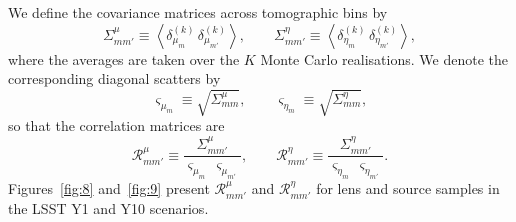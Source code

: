 We define the covariance matrices across tomographic bins by
\begin{equation} \label{eq:31}
    \Sigma^\mu_{m m'} \equiv \left\langle \delta^{(k)}_{\mu_{m}} \, \delta^{(k)}_{\mu_{m'}} \right\rangle, \qquad \Sigma^\eta_{m m'} \equiv \left\langle \delta^{(k)}_{\eta_{m}} \, \delta^{(k)}_{\eta_{m'}} \right\rangle,
\end{equation}
where the averages are taken over the \(K\) Monte Carlo realisations. We denote the corresponding diagonal scatters by
\begin{equation} \label{eq:32}
    \varsigma_{\mu_m} \equiv \sqrt{\Sigma^{\mu}_{m m}}, \qquad \varsigma_{\eta_m} \equiv \sqrt{\Sigma^{\eta}_{m m}},
\end{equation}
so that the correlation matrices are
\begin{equation} \label{eq:33}
    \mathcal{R}^\mu_{m m'} \equiv \frac{\Sigma^\mu_{m m'}}{\varsigma_{\mu_{m}} \, \varsigma_{\mu_{m'}}}, \qquad \mathcal{R}^\eta_{m m'} \equiv \frac{\Sigma^\eta_{m m'}}{\varsigma_{\eta_{m}} \, \varsigma_{\eta_{m'}}}.
\end{equation}
Figures~\ref{fig:8} and~\ref{fig:9} present \(\mathcal{R}^{\mu}_{m m'}\) and \(\mathcal{R}^{\eta}_{m m'}\) for lens and source samples in the LSST Y1 and Y10 scenarios.

